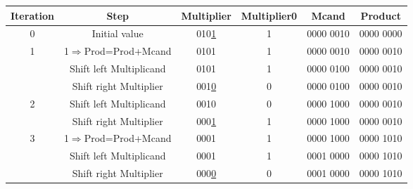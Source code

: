 \documentclass[12pt, a4paper]{article}
\begin{document}
\begin{ans}
    \begin{center}
        \begin{tabular}{|c|c|c|c|c|c|}
            \hline
            Iteration & Step & Multiplier & Multiplier0 & Mcand & Product\\
            \hline
            0 & Initial value & 010\underline{1} & 1 & 0000 0010 & 0000 0000\\
            \hline
            \multirow{3}{*}{1} & \multicolumn{1}{|c}{1$\Rightarrow$Prod=Prod+Mcand} & \multicolumn{1}{|c}{0101} & \multicolumn{1}{|c}{1} & \multicolumn{1}{|c}{0000 0010} & \multicolumn{1}{|c|}{0000 0010} \\\cline{2-6}
                                & \multicolumn{1}{|c}{Shift left Multiplicand} & \multicolumn{1}{|c}{0101} & \multicolumn{1}{|c}{1} & \multicolumn{1}{|c}{0000 0100} & \multicolumn{1}{|c|}{0000 0010} \\\cline{2-6}
                                & \multicolumn{1}{|c}{Shift right Multiplier} & \multicolumn{1}{|c}{001\underline{0}} & \multicolumn{1}{|c}{0} & \multicolumn{1}{|c}{0000 0100} & \multicolumn{1}{|c|}{0000 0010} \\\hline

            \multirow{2}{*}{2} 
                                & \multicolumn{1}{|c}{Shift left Multiplicand} & \multicolumn{1}{|c}{0010} & \multicolumn{1}{|c}{0} & \multicolumn{1}{|c}{0000 1000} & \multicolumn{1}{|c|}{0000 0010} \\\cline{2-6}
                                & \multicolumn{1}{|c}{Shift right Multiplier} & \multicolumn{1}{|c}{000\underline{1}} & \multicolumn{1}{|c}{1} & \multicolumn{1}{|c}{0000 1000} & \multicolumn{1}{|c|}{0000 0010} \\\hline

            \multirow{3}{*}{3} & \multicolumn{1}{|c}{1$\Rightarrow$Prod=Prod+Mcand} & \multicolumn{1}{|c}{0001} & \multicolumn{1}{|c}{1} & \multicolumn{1}{|c}{0000 1000} & \multicolumn{1}{|c|}{0000 1010} \\\cline{2-6}
                                & \multicolumn{1}{|c}{Shift left Multiplicand} & \multicolumn{1}{|c}{0001} & \multicolumn{1}{|c}{1} & \multicolumn{1}{|c}{0001 0000} & \multicolumn{1}{|c|}{0000 1010} \\\cline{2-6}
                                & \multicolumn{1}{|c}{Shift right Multiplier} & \multicolumn{1}{|c}{000\underline{0}} & \multicolumn{1}{|c}{0} & \multicolumn{1}{|c}{0001 0000} & \multicolumn{1}{|c|}{0000 1010} \\\hline


\end{tabular}
\end{center}
\end{ans}
\end{document}
